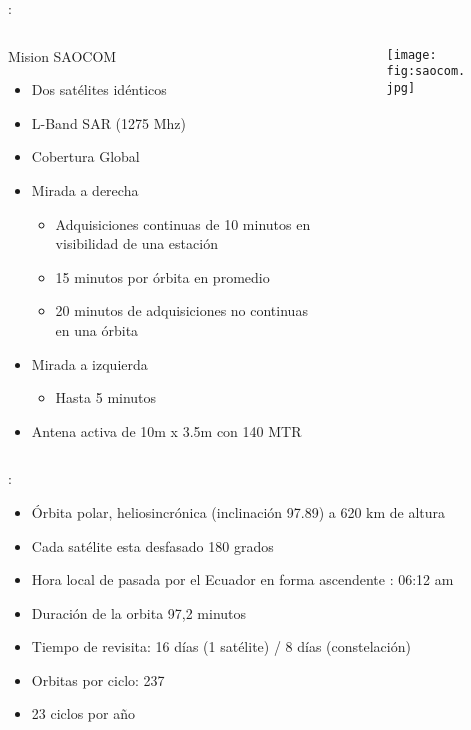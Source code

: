 \begin{frame}{\secname : \subsecname}
  \begin{columns}
    \begin{column}{0.6\textwidth}
     \begin{block}{Mision SAOCOM}
\begin{itemize}
  \item Dos satélites idénticos
  \item L-Band SAR (1275 Mhz)
  \item Cobertura Global
  \item Mirada a derecha
  \begin{itemize}
    \item Adquisiciones continuas de 10 minutos en visibilidad de una estación
    \item 15 minutos por órbita en promedio
    \item 20 minutos de adquisiciones no continuas en una órbita
  \end{itemize}
  \item Mirada a izquierda
  \begin{itemize}
    \item Hasta 5 minutos
  \end{itemize}
  \item Antena activa de 10m x 3.5m con 140 MTR
\end{itemize}
     \end{block}
    \end{column}
    \begin{column}{0.4\textwidth}  %
      \begin{figure}
        \centering
        \texttt{[image: fig:saocom.jpg]}
        \caption*{}
        \label{}
      \end{figure}
    \end{column}
    \end{columns}

\end{frame}

\begin{frame}{\secname : \subsecname}
\begin{itemize}
  \item Órbita polar, heliosincrónica (inclinación 97.89) a 620 km de altura
  \item Cada satélite esta desfasado 180 grados
  \item Hora local de pasada por el Ecuador en forma ascendente : 06:12 am
  \item Duración de la orbita 97,2 minutos
  \item Tiempo de revisita: 16 días (1 satélite) / 8 días (constelación)
  \item Orbitas por ciclo: 237
  \item 23 ciclos por año
\end{itemize}
\end{frame}

